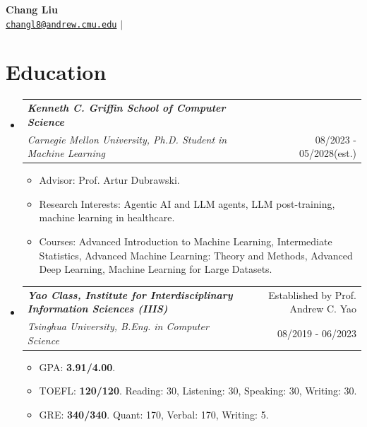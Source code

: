 \documentclass[letterpaper,11pt]{article}
\makeatletter
\newcommand{\resumeItem}[1]{
  \item\small{
    {#1 \vspace{-1pt}}
  }
}
\newcommand{\resumeSubheading}[4]{
  \vspace{-1pt}\item
    \begin{tabular*}{\textwidth}[t]{l@{\extracolsep{\fill}}r}
      \textbf{\textit{#1}} & {\color{dark-grey}\small #2}\vspace{1pt}\\ %
      \textit{#3} & {\color{dark-grey} \small #4}\\ %
    \end{tabular*}\vspace{-4pt}
}
\newcommand{\resumeSubHeadingListStart}{\begin{itemize}[leftmargin=0in, label={}]}
\newcommand{\resumeSubHeadingListEnd}{\end{itemize}}
\newcommand{\resumeItemListStart}{\begin{itemize}}
\newcommand{\resumeItemListEnd}{\end{itemize}\vspace{0pt}}
\makeatother
\begin{document}
\begin{center}
    \textbf{\Huge Chang Liu} \\ \vspace{5pt}
    \small \faEnvelope \hspace{2pt} \texttt{\href{mailto:changl8@andrew.cmu.edu}{changl8@andrew.cmu.edu}} \hspace{1pt} 
    $|$ \hspace{1pt} \faHome \hspace{2pt} \texttt{\href{https://changliu-drpatient.github.io/}{\color{magenta}{changliu-drpatient.github.io}}} \hspace{1pt} 
    \\ \vspace{-3pt}
\end{center}


\section{Education}
  \resumeSubHeadingListStart
    \resumeSubheading
      {Kenneth C. Griffin School of Computer Science}{}
      {Carnegie Mellon University, Ph.D. Student in Machine Learning}{08/2023 - 05/2028(est.)}
      \resumeItemListStart
        \resumeItem {Advisor: Prof. Artur Dubrawski.}
        \resumeItem {Research Interests: Agentic AI and LLM agents, LLM post-training, machine learning in healthcare.}
        \resumeItem {Courses: Advanced Introduction to Machine Learning, Intermediate Statistics, Advanced Machine Learning: Theory and Methods, Advanced Deep Learning, Machine Learning for Large Datasets.}
      \resumeItemListEnd
    \resumeSubheading
      {Yao Class, Institute for Interdisciplinary Information Sciences (IIIS)}{Established by Prof. Andrew C. Yao}
      {Tsinghua University, B.Eng. in Computer Science}{08/2019 - 06/2023}
      \resumeItemListStart
        \resumeItem {GPA: \textbf{3.91/4.00}.}
        \resumeItem {TOEFL: \textbf{120/120}. Reading: 30, Listening: 30, Speaking: 30, Writing: 30.}
        \resumeItem {GRE: \textbf{340/340}. Quant: 170, Verbal: 170, Writing: 5.}
      \resumeItemListEnd
  \resumeSubHeadingListEnd
\end{document}
